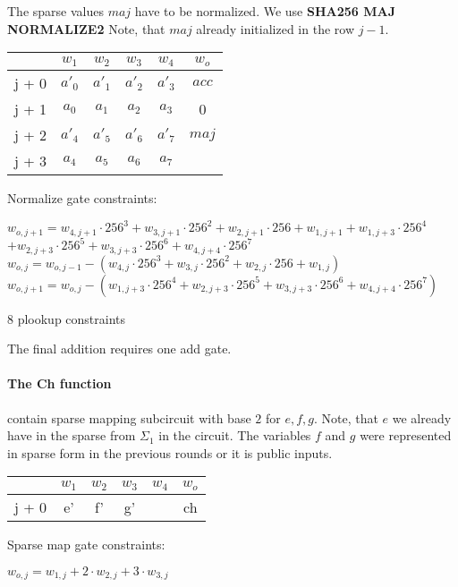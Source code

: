 The sparse values $maj$ have to be normalized.
We use \textbf{SHA256 MAJ NORMALIZE2}
Note, that $maj$ already initialized in the row $j - 1$.
\begin{center}
\begin{tabular}{ c|c|c|c|c|c} 
  & $w_1$ & $w_2$ & $w_3$ & $w_4$ & $w_o$\\ 
 \hline
j + 0 & $a'_0$ & $a'_1$ & $a'_2$ & $a'_3$ &  $acc$\\ 
j + 1 & $a_0$ & $ a_1$ & $a_2$ & $a_3$ & 0\\
j + 2 & $a'_4$ & $a'_5$ & $a'_6$ & $a'_7$ & $maj$ \\ 
j + 3 & $a_4$ & $ a_5$ & $a_6$ & $a_7$ &  \\
\end{tabular}
\end{center}

Normalize gate constraints:
\begin{center}
$w_{o,j+1} = w_{4,j+1} \cdot 256^3 + w_{3,j+1} \cdot 256^2 + w_{2,j+1} \cdot 256 + w_{1,j+1}
	+  w_{1,j+3} \cdot 256^4$ \\ 
	$+ w_{2,j+3} \cdot 256^5+ w_{3,j+3} \cdot 256^6 + w_{4,j+4} \cdot 256^7$ \\
$w_{o,j} = w_{o, j - 1} - (w_{4,j} \cdot 256^3 + w_{3,j} \cdot 256^2 + w_{2,j} \cdot 256 + w_{1,j})$ \\
$w_{o,j+1} = w_{o,j} - ( w_{1,j+3} \cdot 256^4 + w_{2,j+3} \cdot 256^5+ w_{3,j+3} \cdot 256^6 + w_{4,j+4} \cdot 256^7)$

8 plookup constraints \\
\end{center}


The final addition requires one add gate.

\paragraph{The Ch function}
contain sparse mapping subcircuit with base $2$ for $e, f ,g$.
Note, that $e$ we already have in the sparse from $\Sigma_1$ in the circuit. 
The variables $f$ and $g$ were represented in sparse form in the previous rounds or it is public inputs.
\begin{center}
\begin{tabular}{ c|c|c|c|c|c } 
  & $w_1$ & $w_2$ & $w_3$ & $w_4$ & $w_o$\\ 
 \hline 
j + 0 & e' & f' & g' & & ch\\
\end{tabular}
\end{center}
Sparse map gate constraints:
\begin{center}
$w_{o, j} = w_{1,j} + 2 \cdot w_{2, j} + 3 \cdot w_{3, j}$ \\
\end{center}

